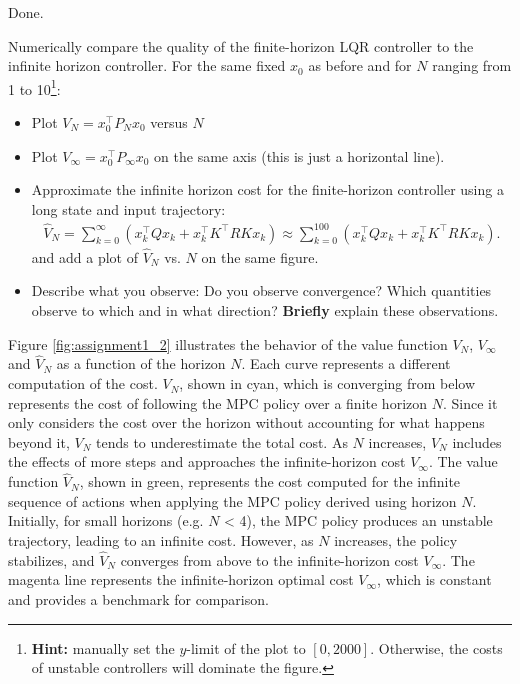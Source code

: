 \documentclass[]{article}
\begin{document}
\begin{flushleft}
	Done.
\end{flushleft}



\begin{assignment}
	Numerically compare the quality of the finite-horizon LQR controller to the infinite horizon controller. 
	For the same fixed $x_0$ as before and for $N$ ranging from 1 to 10\footnote{\textbf{Hint:} manually set the $y$-limit of the plot to $[0, 2000]$. Otherwise, the costs of unstable controllers will dominate the figure.}: 
\begin{itemize}
	\item Plot $V_{N} = x_0^\top P_N x_0$ versus $N$
	\item Plot $V_{\infty} = x_0^\top P_{\infty} x_0$ on the same axis (this is just a horizontal line).
	\item Approximate the infinite horizon cost for the finite-horizon controller using a long state and input trajectory:
		\begin{align} \nonumber
			\hat{V}_{N} = \sum_{k=0}^\infty(x_k^\top Q x_k + x_k^\top K^\top R K x_k) \approx \sum_{k=0}^{100}(x_k^\top Q x_k + x_k^\top K^\top R K x_k). 
		\end{align}
	and add a plot of $\hat{V}_N$ vs. $N$ on the same figure.
	\item Describe what you observe: Do you observe convergence? Which quantities observe to which and in what direction? \textbf{Briefly} explain these observations.
\end{itemize}
\end{assignment}

\begin{flushleft}
Figure \ref{fig:assignment1_2} illustrates the behavior of the value function $ V_N $, $ V_\infty $ and $ \hat{V}_N $ as a function of the horizon $ N $.
Each curve represents a different computation of the cost. $ V_N $, shown in cyan, which is converging from below represents the cost of following the MPC policy over a finite horizon 
$ N $. Since it only considers the cost over the horizon without accounting for what happens beyond it, $V_N$ tends to underestimate the total cost. As $N$ increases, $V_N$ includes the effects of more steps and approaches the infinite-horizon cost $V_\infty$.
The value function $\hat{V}_N$, shown in green, represents the cost computed for the infinite sequence of actions when applying the MPC policy derived using horizon $N$.
Initially, for small horizons (e.g. $N$ < 4), the MPC policy produces an unstable trajectory, leading to an infinite cost. However, as $N$ increases, the policy stabilizes, and 
$\hat{V}_N$ converges from above to the infinite-horizon cost $V_\infty$. The magenta line represents the infinite-horizon optimal cost $V_\infty$, which is constant and provides a benchmark for comparison.  
\end{flushleft}
\end{document}
